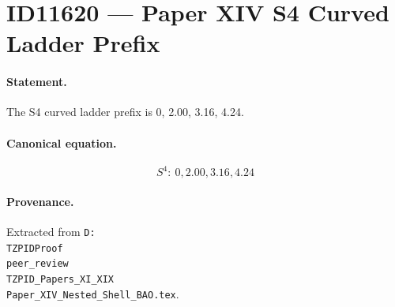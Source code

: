 \section*{ID11620 --- Paper XIV S4 Curved Ladder Prefix}

\paragraph{Statement.}
The S4 curved ladder prefix is 0, 2.00, 3.16, 4.24.

\paragraph{Canonical equation.}
\[
S^4:\ 0,2.00,3.16,4.24
\]

\paragraph{Provenance.}
Extracted from \texttt{D:\\TZPIDProof\\peer\_review\\TZPID\_Papers\_XI\_XIX\\Paper\_XIV\_Nested\_Shell\_BAO.tex}.
